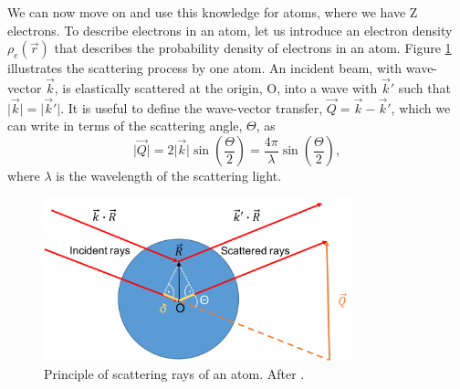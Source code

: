 We can now move on and use this knowledge for atoms, where we have Z electrons. To describe electrons in an atom, let us introduce an electron density $\rho_{e}\left(\vec{r}\right)$ that describes the probability density of electrons in an atom. Figure \ref{fig:X-ray-scattering} illustrates the scattering process by one atom. An incident beam, with wave-vector $\vec{k}$, is elastically scattered at the origin, O, into a wave with $\vec{k}'$ such that $\lvert \vec{k}\rvert=\lvert \vec{k}'\rvert$. 
It is useful to define the wave-vector transfer, $\vec{Q} = \vec{k}-\vec{k}'$, which we can write in terms of the scattering angle, $\Theta$, as
\begin{equation}
\lvert \vec{Q}\rvert=2 \lvert \vec{k}\rvert \sin\left(\frac{\Theta}{2}\right)=\frac{4 \pi}{\lambda}\sin\left(\frac{\Theta}{2}\right),
\label{eq:Q-scattering-angle}
\end{equation}
where $\lambda$ is the wavelength of the scattering light.\\[1\baselineskip]
\begin{figure}
	\centering
		\includegraphics[width=0.80\textwidth]{images/X-ray-scattering.png}
	\caption[Principle of scattering rays of an atom.]{Principle of scattering rays of an atom. After \citep{Als-Nielson-2011-JWS,Guinier-1955-JWS}.}
	\label{fig:X-ray-scattering}
\end{figure}
